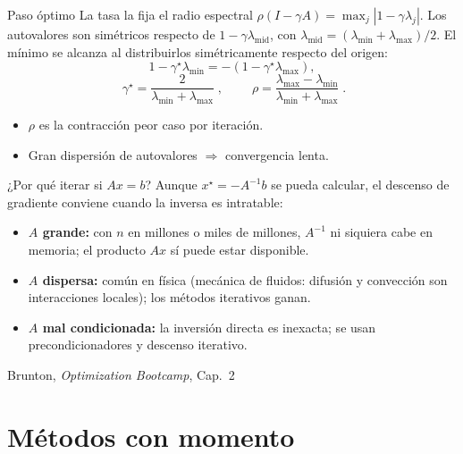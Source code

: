 \documentclass[10pt,aspectratio=169]{beamer}
\newcommand{\fuente}{\vfill{\scriptsize\color{gray}Brunton, \emph{Optimization Bootcamp}, Cap.~2}}
\begin{document}
\begin{frame}{Paso óptimo}
  \small
  La tasa la fija el radio espectral $\rho(I-\gamma A)=\max_j|1-\gamma\lambda_j|$.
  Los autovalores son simétricos respecto de $1-\gamma\lambda_{\mathrm{mid}}$, con
  $\lambda_{\mathrm{mid}}=(\lambda_{\min}+\lambda_{\max})/2$.
  El mínimo se alcanza al distribuirlos simétricamente respecto del origen:
  \[
    1-\gamma^{\star}\lambda_{\min}=-(1-\gamma^{\star}\lambda_{\max}),
  \]
  \[
    \boxed{\;\gamma^{\star}=\frac{2}{\lambda_{\min}+\lambda_{\max}}\;},
    \qquad
    \boxed{\;\rho=\frac{\lambda_{\max}-\lambda_{\min}}{\lambda_{\min}+\lambda_{\max}}\;}.
  \]
  \begin{itemize}
    \item $\rho$ es la contracción peor caso por iteración.
    \item Gran dispersión de autovalores $\Rightarrow$ convergencia lenta.
  \end{itemize}
\end{frame}

\begin{frame}{¿Por qué iterar si $Ax=b$?}
  \small
  Aunque $x^\star=-A^{-1}b$ se pueda calcular, el descenso de gradiente conviene cuando
  la inversa es intratable:
  \begin{itemize}
    \item \textbf{$A$ grande:} con $n$ en millones o miles de millones, $A^{-1}$ ni siquiera
      cabe en memoria; el producto $Ax$ sí puede estar disponible.
    \item \textbf{$A$ dispersa:} común en física (mecánica de fluidos: difusión y convección
      son interacciones locales); los métodos iterativos ganan.
    \item \textbf{$A$ mal condicionada:} la inversión directa es inexacta; se usan
      precondicionadores y descenso iterativo.
  \end{itemize}
  \fuente
\end{frame}

\section{Métodos con momento}
\end{document}
